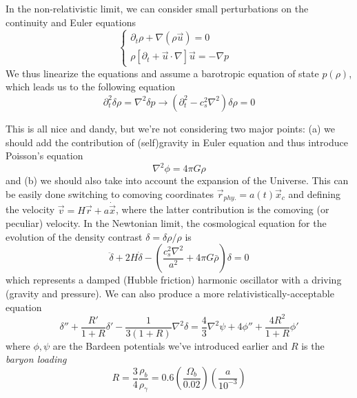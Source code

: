 In the non-relativistic limit, we can consider small perturbations on the continuity and Euler equations
\begin{equation}
    \left\{
    \begin{array}{ll}
        \partial_{t}\rho + \nabla(\rho\vec{u}) = 0 & \\
        \rho\left[\partial_{t}+\vec{u}\cdot\nabla\right]\vec{u} = -\nabla p
    \end{array}
    \right.
\end{equation}
We thus linearize the equations and assume a barotropic equation of state $p(\rho)$, which leads us to the following equation
\begin{equation}
    \partial_{t}^{2}\delta\rho = \nabla^{2}\delta p \to (\partial_{t}^{2}-c_{s}^{2}\nabla^{2})\delta\rho = 0
\end{equation}
\par This is all nice and dandy, but we're not considering two major points: (a) we should add the contribution of (self)gravity in Euler equation and thus introduce Poisson's equation
\begin{equation}
    \nabla^{2}\phi = 4\pi G\rho
    \label{eq:poisson-eq}
\end{equation}
and (b) we should also take into account the expansion of the Universe. This can be easily done switching to comoving coordinates $\vec{r}_{phy.} = a(t)\vec{x}_{c}$ and defining the velocity $\vec{v} = H\vec{r} + a\dot{\vec{x}}$, where the latter contribution is the comoving (or peculiar) velocity. In the Newtonian limit, the cosmological equation for the evolution of the density contrast $\delta = \delta\rho/\rho$ is 
\begin{equation}
    \ddot{\delta} + 2H\dot{\delta} - \left(\frac{c_{s}^{2}\nabla^{2}}{a^{2}}+4\pi G \bar{\rho}\right)\delta = 0
\end{equation}
which represents a damped (Hubble friction) harmonic oscillator with a driving (gravity and pressure). We can also produce a more relativistically-acceptable equation 
\begin{equation}
    \boxed{
    \delta'' + \frac{R'}{1+R}\delta' - \frac{1}{3(1+R)}\nabla^{2}\delta = \frac{4}{3}\nabla^{2}\psi + 4\phi'' + \frac{4R^{2}}{1+R}\phi'
    }
    \label{eq:bpfluid-eq}
\end{equation}
where $\phi,\psi$ are the Bardeen potentials we've introduced earlier and $R$ is the \emph{baryon loading}
\begin{equation}
    R = \frac{3}{4}\frac{\rho_{b}}{\rho_{\gamma}} = 0.6\left(\frac{\Omega_{b}}{0.02}\right)\left(\frac{a}{10^{-3}}\right)
\end{equation}
